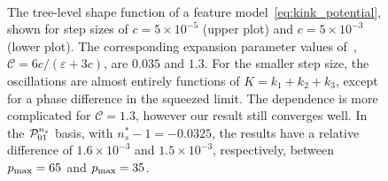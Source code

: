 \begin{figure}[!pth]
\centering
    \\[-2ex]
\caption{
    The tree-level shape function of a feature
    model~\eqref{eq:kink_potential}, shown for step sizes of
    $c=5\times10^{-5}$ (upper plot)
    and $c=5\times10^{-3}$ (lower plot).
    The corresponding expansion parameter values of~\cite{adshead},
    ${\mathcal{C}=6c/(\varepsilon+3c)}$, are $0.035$
    and $1.3$.
    For the smaller step size, the oscillations are almost entirely functions of $K=k_1+k_2+k_3$,
    except for a phase difference in the squeezed limit.
    The dependence is more complicated for $\mathcal{C}=1.3$,
    however our result still converges well.
    In the $\mathcal{P}^{n_s}_{01}$ basis, with $n_s^{*}-1 = -0.0325$,
    the results have a relative difference of $1.6\times10^{-3}$
    and $1.5\times10^{-3}$, respectively,
    between $p_\text{max}=65$ and $p_\text{max}=35$.
}\label{slice_plot_tanh}
\end{figure}
